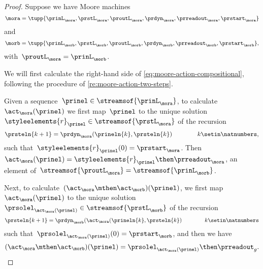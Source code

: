 \begin{proof}
    Suppose we have Moore machines
    \begin{equation}
        \mora = \tupp{\prinL_{\mora},\prstL_{\mora},\proutL_{\mora},\prdyn_{\mora},\prreadout_{\mora},\prstart_{\mora}}
    \end{equation}
    and
    \begin{equation}
        \morb = \tupp{\prinL_{\morb},\prstL_{\morb},\proutL_{\morb},\prdyn_{\morb},\prreadout_{\morb},\prstart_{\morb}},
    \end{equation}
    with~$\proutL_\mora = \prinL_\morb$.

    We will first calculate the right-hand side of \cref{eq:moore-action-compositional}, following the procedure of \cref{re:moore-action-two-steps}.

    Given a sequence~$\prinel \in \streamsof{\prinL_{\mora}}$, to calculate~$\act_\mora(\prinel)$ we first map~$\prinel$ to the unique solution~$\styleelements{r}_\prinel \in \streamsof{\prstL_{\mora}}$ of the recursion
    \begin{equation}
        \prsteln{k+1} = \prdyn_\mora(\prineln{k}, \prsteln{k})  \qquad \qquad k \setin \natnumbers,
    \end{equation}
    such that~$\styleelements{r}_\prinel(0) = \prstart_{\mora}$.
    Then~$\act_\mora(\prinel) = \styleelements{r}_\prinel \then \prreadout_\mora$, an element of~$\streamsof{\proutL_{\mora}} = \streamsof{\prinL_{\morb}}$.

    Next, to calculate~$(\act_\mora \mthen \act_\morb)(\prinel)$, we first map~$\act_\mora(\prinel)$ to the unique solution~$\prsolel_{\act_\mora(\prinel)} \in \streamsof{\prstL_{\morb}}$ of the recursion
        \begin{equation}
            \prsteln{k+1} = \prdyn_\morb(\act_\mora(\prineln{k}, \prsteln{k})  \qquad \qquad k \setin \natnumbers
        \end{equation}
        such that~$\prsolel_{\act_\mora(\prinel)}(0) = \prstart_{\morb}$, and then we have
        \begin{equation}
            \label{eq:Moore-act-composition-1}
            (\act_\mora \mthen \act_\morb)(\prinel) = \prsolel_{\act_\mora(\prinel)} \then \prreadout_g.
        \end{equation}


\end{proof}
